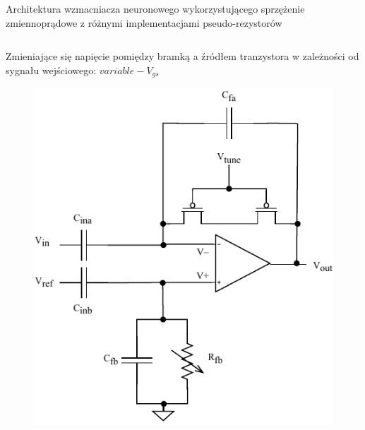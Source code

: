 \begin{frame}{Architektura wzmacniacza neuronowego wykorzystującego sprzężenie zmiennoprądowe z różnymi implementacjami pseudo-rezystorów}
    \begin{columns}[t]

        \vspace{-2em} %

        \begin{alertblock}{Zmieniające się napięcie  pomiędzy bramką a źródłem tranzystora w zależności od sygnału wejściowego: $variable-V_{gs}$}

            \begin{figure}[H]
                \centering
                \includegraphics[scale = 0.55]{Figures/standard.pdf}
            \end{figure}
        \end{alertblock}

        \vspace{-2em} %


\end{columns}
\end{frame}
